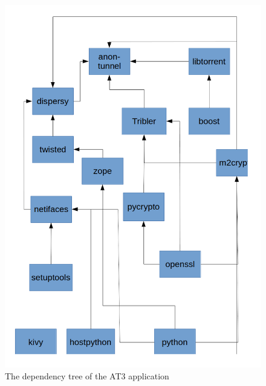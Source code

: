 \begin{figure}[p]
    \centering
    \includegraphics[width=\textwidth]{appendices/dependency-tree.png}
    \caption{The dependency tree of the AT3 application}
    \label{fig:dependency-tree}
\end{figure}